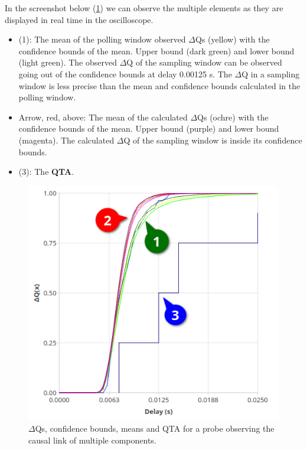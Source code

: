     In the screenshot below (\cref{fig:dq_displ}) we can observe the multiple elements as they are displayed in real time in the oscilloscope.
    \begin{itemize}
        \item (1): The mean of the polling window observed $\Delta$Qs (yellow) with the confidence bounds of the mean. Upper bound (dark green) and lower bound (light green). The observed $\Delta$Q of the sampling window can be observed going out of the confidence bounds at delay 0.00125 s. The $\Delta$Q in a sampling window is less precise than the mean and confidence bounds calculated in the polling window.
        \item Arrow, red, above: The mean of the calculated $\Delta$Qs (ochre) with the confidence bounds of the mean. Upper bound (purple) and lower bound (magenta). The calculated $\Delta$Q of the sampling window is inside its confidence bounds.
        \item (3): The \textbf{QTA}.
    \end{itemize}
     \begin{figure}[H]
        \begin{center}
            \includegraphics[scale = 0.7]{img/overload_2/fired_sampleb.png}
        \end{center}
         \caption{$\Delta$Qs, confidence bounds, means and QTA for a probe observing the causal link of multiple components.}
         \label{fig:dq_displ}
    \end{figure}
        

